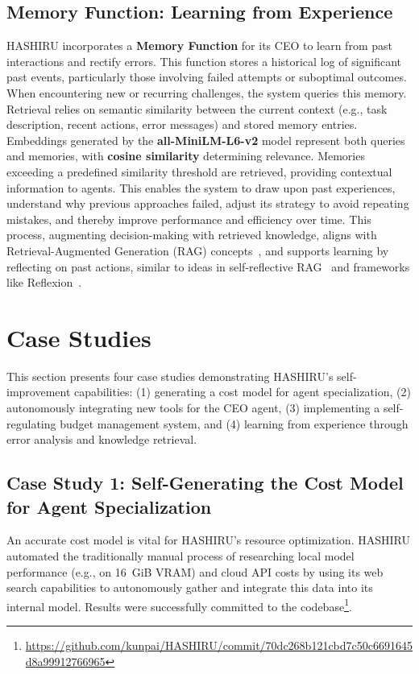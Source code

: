 \documentclass[conference]{IEEEtran}
\begin{document}
\subsection{Memory Function: Learning from Experience}
\label{subsec:memory}

HASHIRU incorporates a \textbf{Memory Function} for its CEO to learn from past interactions and rectify errors. This function stores a historical log of significant past events, particularly those involving failed attempts or suboptimal outcomes. When encountering new or recurring challenges, the system queries this memory. Retrieval relies on semantic similarity between the current context (e.g., task description, recent actions, error messages) and stored memory entries. Embeddings generated by the \textbf{all-MiniLM-L6-v2} model \cite{wang2020minilmdeepselfattentiondistillation} represent both queries and memories, with \textbf{cosine similarity} determining relevance. Memories exceeding a predefined similarity threshold are retrieved, providing contextual information to agents. This enables the system to draw upon past experiences, understand why previous approaches failed, adjust its strategy to avoid repeating mistakes, and thereby improve performance and efficiency over time. This process, augmenting decision-making with retrieved knowledge, aligns with Retrieval-Augmented Generation (RAG) concepts~\cite{lewis2021retrievalaugmentedgenerationknowledgeintensivenlp}, and supports learning by reflecting on past actions, similar to ideas in self-reflective RAG~\cite{asai2023self} and frameworks like Reflexion~\cite{shinn2023reflexion}.

\section{Case Studies}
\label{sec:casestudies}
This section presents four case studies demonstrating HASHIRU's self-improvement capabilities: (1) generating a cost model for agent specialization, (2) autonomously integrating new tools for the CEO agent, (3) implementing a self-regulating budget management system, and (4) learning from experience through error analysis and knowledge retrieval.

\subsection{Case Study 1: Self-Generating the Cost Model for Agent Specialization}
\label{sec:casestudy1_costmodel}
An accurate cost model is vital for HASHIRU's resource optimization. HASHIRU automated the traditionally manual process of researching local model performance (e.g., on 16~GiB VRAM) and cloud API costs by using its web search capabilities to autonomously gather and integrate this data into its internal model. Results were successfully committed to the codebase\footnote{\url{https://github.com/kunpai/HASHIRU/commit/70dc268b121cbd7c50c6691645d8a99912766965}}.
\end{document}
